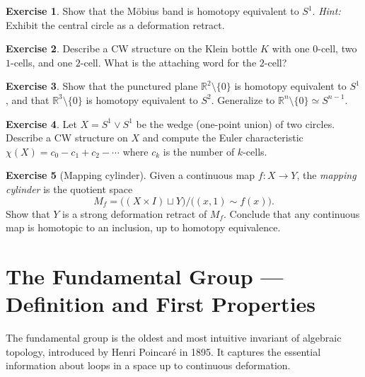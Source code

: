 \documentclass[12pt,a4paper,openany]{book}
\theoremstyle{definition}
\newtheorem{exercise}{Exercise}[chapter]
\theoremstyle{plain}
\theoremstyle{remark}
\newcommand{\R}{\mathbb{R}}
\begin{document}
\begin{exercise}\label{exo:ch1-6}
Show that the M\"{o}bius band is homotopy equivalent to $S^1$.
\emph{Hint:} Exhibit the central circle as a deformation retract.
\end{exercise}

\begin{exercise}\label{exo:ch1-7}
Describe a CW structure on the Klein bottle $K$ with one $0$-cell, two
$1$-cells, and one $2$-cell. What is the attaching word for the $2$-cell?
\end{exercise}

\begin{exercise}\label{exo:ch1-8}
Show that the punctured plane $\R^2 \setminus \{0\}$ is homotopy equivalent to
$S^1$, and that $\R^3 \setminus \{0\}$ is homotopy equivalent to $S^2$.
Generalize to $\R^n \setminus \{0\} \simeq S^{n-1}$.
\end{exercise}

\begin{exercise}\label{exo:ch1-9}
Let $X = S^1 \vee S^1$ be the wedge (one-point union) of two circles. Describe
a CW structure on $X$ and compute the Euler characteristic $\chi(X) = c_0 - c_1
+ c_2 - \cdots$ where $c_k$ is the number of $k$-cells.
\end{exercise}

\begin{exercise}[{Mapping cylinder}]\label{exo:ch1-10}
Given a continuous map $f \colon X \to Y$, the \emph{mapping cylinder} is the
quotient space
\[
  M_f = \bigl( (X \times I) \sqcup Y \bigr) / \bigl( (x,1) \sim f(x) \bigr).
\]
Show that $Y$ is a strong deformation retract of $M_f$. Conclude that any
continuous map is homotopic to an inclusion, up to homotopy equivalence.
\end{exercise}


\chapter{The Fundamental Group --- Definition and First Properties}\label{ch:fundamental-group}

The fundamental group is the oldest and most intuitive invariant of algebraic
topology, introduced by Henri Poincar\'{e} in 1895. It captures the essential
information about loops in a space up to continuous deformation.
\end{document}
